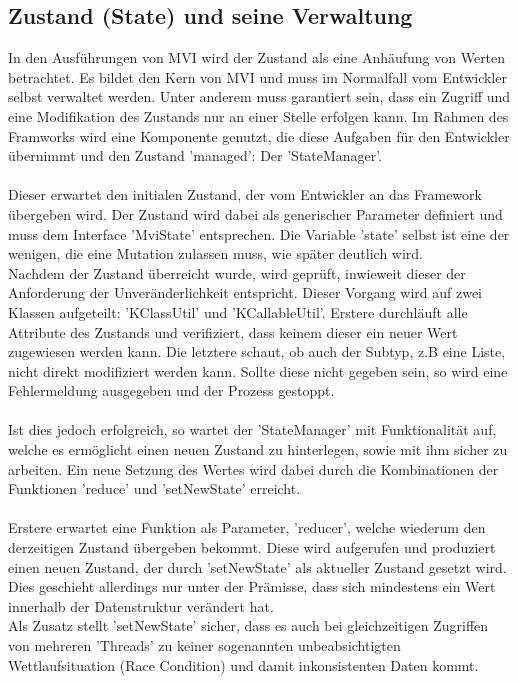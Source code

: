 \subsection{Zustand (State) und seine Verwaltung}
\label{subsec:zustand-und-statemanager}
In den Ausführungen von MVI wird der Zustand als eine Anhäufung von Werten betrachtet. Es bildet den Kern von MVI und muss im Normalfall vom Entwickler selbst verwaltet werden. Unter anderem muss garantiert sein, dass ein Zugriff und eine Modifikation des Zustands nur an einer Stelle erfolgen kann. Im Rahmen des Framworks wird eine Komponente genutzt, die diese Aufgaben für den Entwickler übernimmt und den Zustand 'managed': Der 'StateManager'.
\\\\
Dieser erwartet den initialen Zustand, der vom Entwickler an das Framework übergeben wird. Der Zustand wird dabei als generischer Parameter definiert und muss dem Interface 'MviState' entsprechen. Die Variable 'state' selbst ist eine der wenigen, die eine Mutation zulassen muss, wie später deutlich wird.
\\
Nachdem der Zustand überreicht wurde, wird geprüft, inwieweit dieser der Anforderung der Unveränderlichkeit entspricht. Dieser Vorgang wird auf zwei Klassen aufgeteilt: 'KClassUtil' und 'KCallableUtil'. Erstere durchläuft alle Attribute des Zustands und verifiziert, dass keinem dieser ein neuer Wert zugewiesen werden kann. Die letztere schaut, ob auch der Subtyp, z.B eine Liste, nicht direkt modifiziert werden kann. Sollte diese nicht gegeben sein, so wird eine Fehlermeldung ausgegeben und der Prozess gestoppt.
\\\\
Ist dies jedoch erfolgreich, so wartet der 'StateManager' mit Funktionalität auf, welche es ermöglicht einen neuen Zustand zu hinterlegen, sowie mit ihm sicher zu arbeiten. Ein neue Setzung des Wertes wird dabei durch die Kombinationen der Funktionen 'reduce' und 'setNewState' erreicht. 
\\\\
Erstere erwartet eine Funktion als Parameter, 'reducer', welche wiederum den derzeitigen Zustand übergeben bekommt. Diese wird aufgerufen und produziert einen neuen Zustand, der durch 'setNewState' als aktueller Zustand gesetzt wird. Dies geschieht allerdings nur unter der Prämisse, dass sich mindestens ein Wert innerhalb der Datenstruktur verändert hat.
\\
Als Zusatz stellt 'setNewState' sicher, dass es auch bei gleichzeitigen Zugriffen von mehreren 'Threads' zu keiner sogenannten unbeabsichtigten Wettlaufsituation (Race Condition) und damit inkonsistenten Daten kommt.
